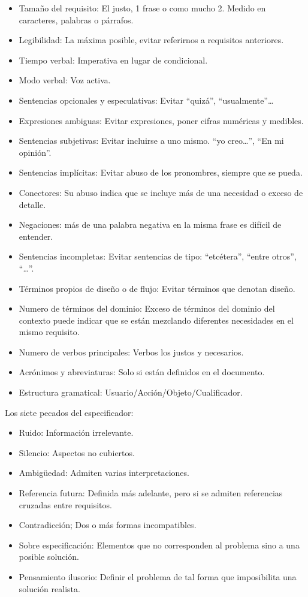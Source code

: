 \documentclass[12pt, twoside, openright]{report} %
\begin{document}
\begin{itemize}
	\item Tamaño del requisito: El justo, 1 frase o como mucho 2. Medido en
	      caracteres, palabras o párrafos.
	\item Legibilidad: La máxima posible, evitar referirnos a requisitos
	      anteriores.
	\item Tiempo verbal: Imperativa en lugar de condicional.
	\item Modo verbal: Voz activa.
	\item Sentencias opcionales y especulativas: Evitar \enquote{quizá},
	\enquote{usualmente}\ldots{}
	\item Expresiones ambiguas: Evitar expresiones, poner cifras numéricas y
	      medibles.
	\item Sentencias subjetivas: Evitar incluirse a uno mismo. \enquote{yo
	      creo\ldots{}}, \enquote{En mi opinión}.
	\item Sentencias implícitas: Evitar abuso de los pronombres, siempre que
	      se pueda.
	\item Conectores: Su abuso indica que se incluye más de una necesidad o
	      exceso de detalle.
	\item Negaciones: más de una palabra negativa en la misma frase es
	      difícil de entender.
	\item Sentencias incompletas: Evitar sentencias de tipo: \enquote{etcétera},
	\enquote{entre otros}, \enquote{\ldots{}}.
	\item Términos propios de diseño o de flujo: Evitar términos que denotan
	      diseño.
	\item Numero de términos del dominio: Exceso de términos del dominio del
	      contexto puede indicar que se están mezclando diferentes
	      necesidades en el mismo requisito.
	\item Numero de verbos principales: Verbos los justos y necesarios.
	\item Acrónimos y abreviaturas: Solo si están definidos en el documento.
	\item Estructura gramatical: Usuario/Acción/Objeto/Cualificador.
\end{itemize}

Los siete pecados del especificador:

\begin{itemize}
	\item Ruido: Información irrelevante.
	\item Silencio: Aspectos no cubiertos.
	\item Ambigüedad: Admiten varias interpretaciones.
	\item Referencia futura: Definida más adelante, pero si se admiten
	      referencias cruzadas entre requisitos.
	\item Contradicción; Dos o más formas incompatibles.
	\item Sobre especificación: Elementos que no corresponden al problema
	      sino a una posible solución.
	\item Pensamiento ilusorio: Definir el problema de tal forma que
	      imposibilita una solución realista.
\end{itemize}
\end{document}
